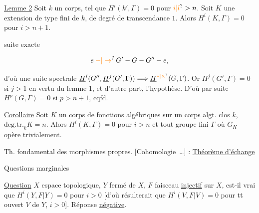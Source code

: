 
\uline{Lemme 2} Soit $k$ un corps, tel que $H^i(k',\Gamma)=0$ pour $\unsure{i|l}>n$.  Soit $K$ une extension de  type fini de $k$, de degré de transcendance $1$. Alors $H^i(K,\Gamma)=0$ pour $i>n+1$.


  suite exacte

\[
e \mathbin{\unsure{-|\to}} G' - G - G'' - e,
\]

d'où une suite spectrale $\underline{H}^i(G'',\underline{H}^j(G',\Gamma))\Longrightarrow\underline{H}^{\unsure{*|\times}}(G,\Gamma)$. Or $H^j(G',\Gamma)=0$ si $j>1$ en vertu du lemme 1, et d'autre part,   l'hypothèse. D'où par suite $H^p(G,\Gamma)=0$ si $p>n+1$, cqfd.

\uline{Corollaire} Soit $K$ un corps de fonctions algébriques sur un corps algt. clos $k$, $\mathrm{deg.tr.}_k K=n$. Alors $H^i(K,\Gamma)=0$ pour $i>n$ et tout groupe  fini $\Gamma$ où $G_K$ opère trivialement.


Th. fondamental des morphismes propres. [Cohomologie \,\ldots] : \uline{Théorème d'échange}

Questions marginales


\uline{Question} $X$ espace topologique, $Y$ fermé de $X$, $F$ faisceau \uline{injectif} sur $X$, est-il vrai que $H^i(Y,F|Y)=0$ pour $i>0$ [d'où résulterait que $H^i(V,F|V)=0$ pour tt ouvert $V$ de $Y$, $i>0$]. Réponse \uline{négative}.

